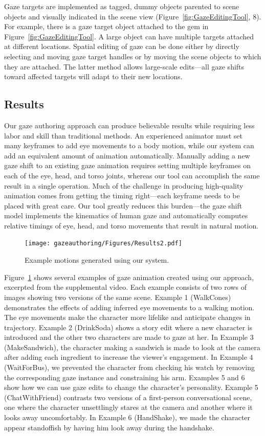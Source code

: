 Gaze targets are implemented as tagged, dummy objects parented to scene objects and visually indicated in the scene view (Figure~\ref{fig:GazeEditingTool}, 8). For example, there is a gaze target object attached to the gem in Figure~\ref{fig:GazeEditingTool}. A large object can have multiple targets attached at different locations. Spatial editing of gaze can be done either by directly selecting and moving gaze target handles or by moving the scene objects to which they are attached. The latter method allows large-scale edits---all gaze shifts toward affected targets will adapt to their new locations.

\subsection{Results}
\label{sec:GazeEditingResults}

Our gaze authoring approach can produce believable results while requiring less labor and skill than traditional methods. An experienced animator must set many keyframes to add eye movements to a body motion, while our system can add an equivalent amount of animation automatically. Manually adding a new gaze shift to an existing gaze animation requires setting multiple keyframes on each of the eye, head, and torso joints, whereas our tool can accomplish the same result in a single operation. Much of the challenge in producing high-quality animation comes from getting the timing right---each keyframe needs to be placed with great care. Our tool greatly reduces this burden---the gaze shift model implements the kinematics of human gaze and automatically computes relative timings of eye, head, and torso movements that result in natural motion.

\begin{figure}
\centering
\texttt{[image: gazeauthoring/Figures/Results2.pdf]}
\caption{Example motions generated using our system.}
\label{fig:GazeEditResults}
\end{figure}

Figure~\ref{fig:GazeEditResults} shows several examples of gaze animation created using our approach, excerpted from the supplemental video. Each example consists of two rows of images showing two versions of the same scene. Example 1 (WalkCones) demonstrates the effects of adding inferred eye movements to a walking motion. The eye movements make the character more lifelike and anticipate changes in trajectory. Example 2 (DrinkSoda) shows a story edit where a new character is introduced and the other two characters are made to gaze at her. In Example 3 (MakeSandwich), the character making a sandwich is made to look at the camera after adding each ingredient to increase the viewer's engagement. In Example 4 (WaitForBus), we prevented the character from checking his watch by removing the corresponding gaze instance and constraining his arm. Examples 5 and 6 show how we can use gaze edits to change the character's personality. Example 5 (ChatWithFriend) contrasts two versions of a first-person conversational scene, one where the character unsettlingly stares at the camera and another where it looks away uncomfortably. In Example 6 (HandShake), we made the character appear standoffish by having him look away during the handshake. 